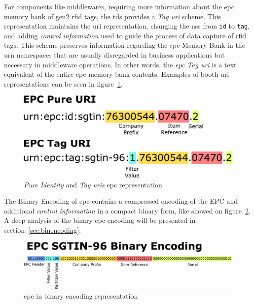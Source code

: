 For components like middlewares, requiring more information about the \ac{epc} memory bank of \ac{gen2} \ac{rfid} tags, the \ac{tds} provides a \emph{Tag \ac{uri}} scheme.
This representation maintains the \ac{uri} representation, changing the \ac{nss} from \texttt{id} to \texttt{tag}, and adding \textit{control information} used to guide the process of data capture of \ac{rfid} tags.
This scheme preserves information regarding the \ac{epc} Memory Bank in the \ac{urn} namespaces that are usually disregarded in business applications but necessary in middleware operations.
In other words, the \emph{\ac{epc} Tag \ac{uri}} is a text equivalent of the entire \ac{epc} memory bank contents.
Examples of booth \ac{uri} representations can be seen in figure~\ref{fig:epcurirepresentation}. 

\begin{figure}[!ht]
    \centering
    \includegraphics[width=\textwidth]{./figs/02-state-of-the-art/SGTIN_First2encodings.pdf}
    \caption[\emph{Pure Identity} and \emph{Tag \acp{uri}} \ac{epc} representation]{\emph{Pure Identity} and \emph{Tag \acp{uri}} \ac{epc} representation~\cite{SGTININFO}} 
    \label{fig:epcurirepresentation}
\end{figure}

The Binary Encoding of \ac{epc} contains a compressed encoding of the EPC and additional \textit{control information} in a compact binary form, like showed on figure~\ref{fig:epcbinencoding}.
A deep analysis of the binary \ac{epc} encoding will be presented in section~\ref{sec:binencoding}.

\begin{figure}[!ht]
    \centering
    \includegraphics[width=\textwidth]{./figs/02-state-of-the-art/SGTIN_binaryconv2.pdf}
    \caption[\ac{epc} in binary encoding representation]{\ac{epc} in binary encoding representation~\cite{SGTININFO}} 
    \label{fig:epcbinencoding}
\end{figure}

